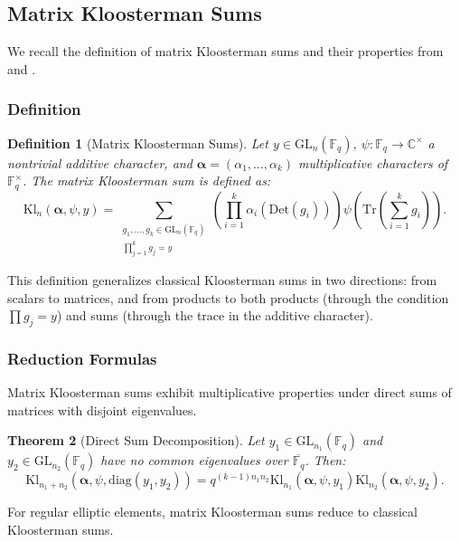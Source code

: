\documentclass[11pt]{article}
\newtheorem{theorem}{Theorem}[section]
\newtheorem{definition}[theorem]{Definition}
\newcommand{\Fq}{\mathbb{F}_q}
\newcommand{\GL}{\mathrm{GL}}
\newcommand{\Kl}{\mathrm{Kl}}
\newcommand{\Tr}{\mathrm{Tr}}
\newcommand{\Det}{\mathrm{Det}}
\newcommand{\diag}{\mathrm{diag}}
\begin{document}
\subsection{Matrix Kloosterman Sums}
\label{sec:matrix_kl}

We recall the definition of matrix Kloosterman sums and their properties from \cite{erdelyi2021matrix} and \cite{zelingher2023matrix}.

\subsubsection{Definition}

\begin{definition}[Matrix Kloosterman Sums]
Let $y \in \GL_n(\Fq)$, $\psi: \Fq \to \mathbb{C}^\times$ a nontrivial additive character, and $\bm{\alpha} = (\alpha_1, \ldots, \alpha_k)$ multiplicative characters of $\Fq^\times$. The matrix Kloosterman sum is defined as:
\[
\Kl_n(\bm{\alpha}, \psi, y) = \sum_{\substack{g_1, \ldots, g_k \in \GL_n(\Fq) \\ \prod_{j=1}^k g_j = y}} \left( \prod_{i=1}^k \alpha_i(\Det(g_i)) \right) \psi\left( \Tr\left( \sum_{i=1}^k g_i \right) \right).
\]
\end{definition}

This definition generalizes classical Kloosterman sums in two directions: from scalars to matrices, and from products to both products (through the condition $\prod g_j = y$) and sums (through the trace in the additive character).

\subsubsection{Reduction Formulas}

Matrix Kloosterman sums exhibit multiplicative properties under direct sums of matrices with disjoint eigenvalues.
\medskip

\begin{theorem}[Direct Sum Decomposition] \cite{erdelyi2021matrix}
\label{thm:direct_sum}
Let $y_1 \in \GL_{n_1}(\Fq)$ and $y_2 \in \GL_{n_2}(\Fq)$ have no common eigenvalues over $\overline{\Fq}$. Then:
\[
\Kl_{n_1+n_2}(\bm{\alpha}, \psi, \diag(y_1, y_2)) = q^{(k-1)n_1n_2} \Kl_{n_1}(\bm{\alpha}, \psi, y_1) \Kl_{n_2}(\bm{\alpha}, \psi, y_2).
\]
\end{theorem}

For regular elliptic elements, matrix Kloosterman sums reduce to classical Kloosterman sums.
\medskip
\end{document}

